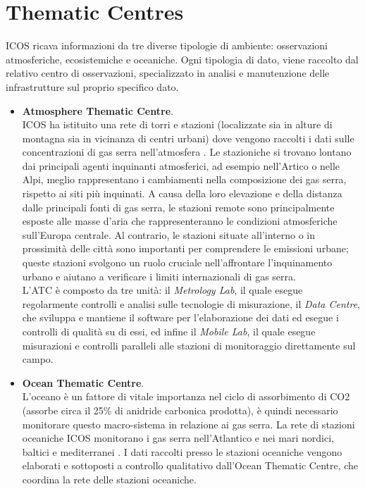 \section{Thematic Centres}
\label{section:thematic}
ICOS ricava informazioni da tre diverse tipologie di ambiente:
osservazioni atmosferiche, ecosistemiche e oceaniche. Ogni
tipologia di dato, viene raccolto dal relativo centro di osservazioni,
specializzato in analisi e manutenzione delle infrastrutture sul proprio
specifico dato.

\begin{itemize}
    \item \textbf{Atmosphere Thematic Centre}.\\
    ICOS ha istituito una rete di torri e stazioni
    (localizzate sia in alture di montagna sia in vicinanza
    di centri urbani)
    dove vengono raccolti i dati sulle concentrazioni di gas
    serra 
    nell'atmosfera \cite{AtmosphereObservationsICOS}. Le stazioniche si trovano lontano dai
    principali agenti inquinanti atmosferici, ad esempio
    nell'Artico o nelle Alpi, meglio
    rappresentano i cambiamenti nella composizione
    dei gas serra, rispetto ai siti più inquinati.
    A causa della loro elevazione e della distanza dalle
    principali fonti di gas serra,
    le stazioni remote sono principalmente esposte
    alle masse d'aria che rappresenteranno le
    condizioni atmosferiche sull'Europa centrale.
    Al contrario, le stazioni situate all'interno o
    in prossimità delle città sono importanti per
    comprendere le emissioni urbane; queste stazioni
    svolgono un ruolo cruciale nell'affrontare
    l'inquinamento urbano e aiutano a verificare
    i limiti internazionali di gas serra.\\

    L'ATC \cite{ICOSAtmosphereThematicCentre} è composto da tre unità: il \textit{Metrology Lab}, il quale
    esegue regolarmente controlli e analisi sulle tecnologie di misurazione,
    il \textit{Data Centre}, che sviluppa e mantiene il software
    per l'elaborazione dei dati ed esegue i controlli di qualità su di essi,
    ed infine il \textit{Mobile Lab}, il quale esegue misurazioni e controlli
    paralleli alle stazioni di monitoraggio direttamente sul campo.

    \item \textbf{Ocean Thematic Centre}.\\
    L'oceano è un fattore di vitale importanza nel ciclo di assorbimento
    di CO2 (assorbe circa il 25\% di anidride carbonica prodotta), è quindi
    necessario monitorare questo macro-sistema in relazione ai gas serra.
    La rete di stazioni oceaniche ICOS monitorano i gas serra
    nell'Atlantico e nei mari nordici, baltici e mediterranei \cite{OceanObservationsICOS}.
    I dati raccolti presso le stazioni oceaniche vengono elaborati
    e sottoposti a controllo qualitativo dall'Ocean Thematic Centre,
    che coordina la rete delle stazioni oceaniche.\\


\end{itemize}
